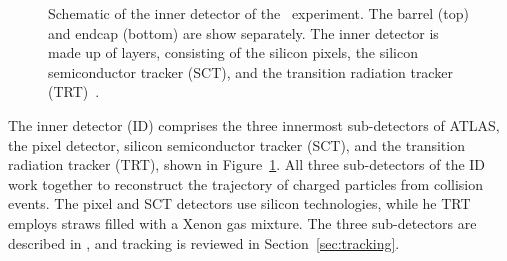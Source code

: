 \begin{figure}[p]
  \caption[
    Schematic of the inner detector of the
    \atlas\ experiment~\cite{1748-0221-3-08-S08003}.
  ]{
    Schematic of the inner detector of the \atlas\ experiment.
    The barrel (top) and endcap (bottom) are show separately.
    The inner detector is made up of layers, consisting of the silicon pixels,
    the silicon semiconductor tracker (SCT), and the transition radiation
    tracker (TRT)~\cite{1748-0221-3-08-S08003}.
  }
  \label{fig:id_cartoon}
\end{figure}

The inner detector (ID) comprises the three innermost sub-detectors of ATLAS,
the pixel detector, silicon semiconductor tracker (SCT), and the transition
radiation tracker (TRT), shown in Figure~\ref{fig:id_cartoon}.
All three sub-detectors of the ID work together to reconstruct the trajectory
of charged particles from collision events.
The pixel and SCT detectors use silicon technologies, while he TRT employs
straws filled with a Xenon gas mixture.
The three sub-detectors are described in ,
and tracking is reviewed in Section~\ref{sec:tracking}.

